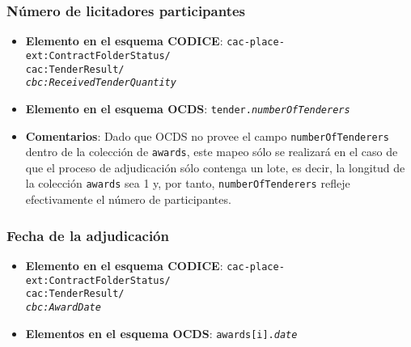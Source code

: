         \subsubsection{Número de licitadores participantes}
            \begin{itemize}
                \item \textbf{Elemento en el esquema CODICE}:
                    \tabto{7.6cm} \texttt{cac-place-ext:ContractFolderStatus/} \\
                    \tabto{7.6cm} \texttt{cac:TenderResult/} \\
                    \tabto{7.6cm} \texttt{\textit{cbc:ReceivedTenderQuantity}}
                \item \textbf{Elemento en el esquema OCDS}:
                    \tabto{7.6cm} \texttt{tender.\textit{numberOfTenderers}}
                \item \textbf{Comentarios}: Dado que OCDS no provee el campo \texttt{numberOfTenderers} dentro de la colección de \texttt{awards}, este mapeo sólo se realizará en el caso de que el proceso de adjudicación sólo contenga un lote, es decir, la longitud de la colección \texttt{awards} sea 1 y, por tanto, \texttt{numberOfTenderers} refleje efectivamente el número de participantes.
            \end{itemize}
            
        \subsubsection{Fecha de la adjudicación}
            \begin{itemize}
                \item \textbf{Elemento en el esquema CODICE}:
                    \tabto{7.6cm} \texttt{cac-place-ext:ContractFolderStatus/} \\
                    \tabto{7.6cm} \texttt{cac:TenderResult/} \\
                    \tabto{7.6cm} \texttt{\textit{cbc:AwardDate}}
                \item \textbf{Elementos en el esquema OCDS}:
                    \tabto{7.6cm} \texttt{awards[i].\textit{date}}
            \end{itemize}
            
